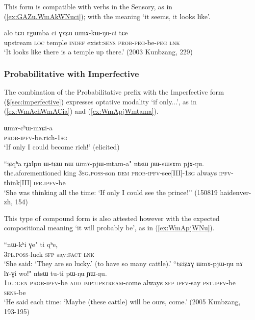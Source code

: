 This form is compatible with verbs in the Sensory, as in (\ref{ex:GAZu.WmAkWNuci}); with the meaning `it seems, it looks like'.

\begin{exe}
\ex \label{ex:GAZu.WmAkWNuci}
\gll alo tɕu rgɯnba ci ɣɤʑu ɯmɤ-kɯ-ŋu-ci tɕe \\
upstream \textsc{loc} temple \textsc{indef} exist:\textsc{sens} \textsc{prob}-\textsc{peg}-be-\textsc{peg} \textsc{lnk} \\
\glt `It looks like there is a temple up there.' (2003 Kunbzang, 229)
\end{exe}

\subsubsection{Probabilitative with Imperfective} \label{sec:WmA.ipfv}
The combination of the Probabilitative prefix with the Imperfective form (§\ref{sec:imperfective}) expresses optative modality `if only...', as in (\ref{ex:WmAchWmACia}) and (\ref{ex:WmApjWmtama}).

\begin{exe}
\ex \label{ex:WmAchWmACia}
\gll ɯmɤ-cʰɯ-mɤɕi-a \\
\textsc{prob}-\textsc{ipfv}-be.rich-\textsc{1sg} \\
\glt `If only I could become rich!' (elicited)
\end{exe}

\begin{exe}
\ex \label{ex:WmApjWmtama}
\gll ``iɕqʰa rɟɤlpu ɯ-tɕɯ nɯ ɯmɤ-pjɯ-mtam-a" ntsɯ ɲɯ-sɯsɤm pjɤ-ŋu. \\
the.aforementioned king \textsc{3sg}.\textsc{poss}-son \textsc{dem} \textsc{prob}-\textsc{ipfv}-see[III]-\textsc{1sg} always \textsc{ipfv}-think[III] \textsc{ifr}.\textsc{ipfv}-be \\
\glt `She was thinking all the time: `If only I could see the prince!'' (150819 haidenver-zh, 154)
\end{exe}

This type of compound form is also attested however with the expected compositional meaning `it will probably be', as in (\ref{ex:WmApjWNu}).

\begin{exe}
\ex 
\begin{xlist}
\ex  
\gll ``nɯ-kʰi ɣe" ti qʰe, \\
\textsc{3pl}.\textsc{poss}-luck \textsc{sfp} say:\textsc{fact} \textsc{lnk} \\
\glt `She said: `They are so lucky.' (to have so many cattle).' 
\ex \label{ex:WmApjWNu}
\gll ``tɕiʑɤɣ ɯmɤ-pjɯ-ŋu nɤ lɤ-ɣi wo!" ntsɯ tu-ti pɯ-ŋu ɲɯ-ŋu. \\
\textsc{1du}:\textsc{gen} \textsc{prob}-\textsc{ipfv}-be \textsc{add} \textsc{imp}:\textsc{upstream}-come always \textsc{sfp} \textsc{ipfv}-say \textsc{pst}.\textsc{ipfv}-be \textsc{sens}-be \\
\glt `He said each time: `Maybe (these cattle) will be ours, come.' (2005 Kunbzang, 193-195)
\end{xlist}
 \end{exe}
 
